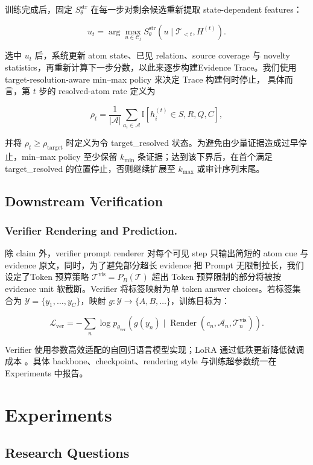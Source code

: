 \documentclass[letterpaper]{article}
\begin{document}
训练完成后，固定 $S_\theta^{\mathrm{str}}$ 在每一步对剩余候选重新提取 state-dependent features：

\[
u_t=\arg\max_{u\in\mathcal C_t}
S_\theta^{\mathrm{str}}(u\mid\mathcal T_{<t},H^{(t)}).
\]

选中 $u_t$ 后，系统更新 atom state、已见 relation、source coverage 与 novelty statistics，再重新计算下一步分数，以此来逐步构建Evidence Trace。我们使用 target-resolution-aware min–max policy 来决定 Trace 构建何时停止， 具体而言，第 \(t\) 步的 resolved-atom rate 定义为

\[
\rho_t=\frac{1}{|\mathcal A|}\sum_{a_i\in\mathcal A}
\mathbb I[h_i^{(t)}\in{S,R,Q,C}],
\]

并将 $\rho_t\ge\rho_{\mathrm{target}}$ 时定义为令 target\_resolved 状态。为避免由少量证据造成过早停止，min–max policy 至少保留 $k_{\min}$ 条证据；达到该下界后，在首个满足 target\_resolved 的位置停止，否则继续扩展至 $k_{\max}$ 或审计序列末尾。

\subsection{Downstream Verification}

\subsubsection{Verifier Rendering and Prediction.}

除 claim 外，verifier prompt renderer 对每个可见 step 只输出简短的 atom cue 与 evidence 原文，同时，为了避免部分超长 evidence 把 Prompt 无限制拉长，我们设定了Token 预算策略 $\mathcal T^{\mathrm{vis}}=P_B(\mathcal T)$ 超出 Token 预算限制的部分将被按evidence unit 软截断。Verifier 将标签映射为单 token answer choices。若标签集合为 $\mathcal Y=\{y_1,\ldots,y_C\}$，映射 $g:\mathcal Y\rightarrow\{A,B,\ldots\}$，训练目标为：

\[
\mathcal L_{\mathrm{ver}}=-\sum_n
\log p_{\theta_{\mathrm{ver}}}\left(g(y_n)\mid
\operatorname{Render}(c_n,\mathcal A_n,\mathcal T_n^{\mathrm{vis}})\right).
\]

Verifier 使用参数高效适配的自回归语言模型实现；LoRA 通过低秩更新降低微调成本 \citep{Hu2022LoRA}。具体 backbone、checkpoint、rendering style 与训练超参数统一在 Experiments 中报告。

\section{Experiments}

\subsection{Research Questions}
\end{document}
